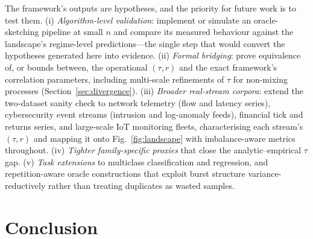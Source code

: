\documentclass[sensors,article,submit,pdftex,moreauthors]{Definitions/mdpi}
\providecommand{\DIFadd}[1]{{\protect\color{blue}#1}} %
\providecommand{\DIFdel}[1]{} %
\providecommand{\DIFaddbegin}{} %
\providecommand{\DIFaddend}{} %
\providecommand{\DIFdelbegin}{} %
\providecommand{\DIFdelend}{} %
\begin{document}
\DIFdelbegin \DIFdel{Future work should pursue: }\DIFdelend \DIFaddbegin \DIFadd{The framework's outputs are hypotheses, and the priority for future work is to test them. }\DIFaddend (i) \DIFdelbegin \DIFdel{tighter, family-specific correlation characterizations that close the proxy--empirical $\tau$ gap; }\DIFdelend \DIFaddbegin \emph{\DIFadd{Algorithm-level validation}}\DIFadd{: implement or simulate an oracle-sketching pipeline at small $n$ and compare its measured behaviour against the landscape's regime-level predictions---the single step that would convert the hypotheses generated here into evidence. }\DIFaddend (ii) \DIFdelbegin \DIFdel{extending the }\DIFdelend \DIFaddbegin \emph{\DIFadd{Formal bridging}}\DIFadd{: prove equivalence of, or bounds between, the operational $(\tau, r)$ and the exact framework's correlation parameters, including multi-scale refinements of $\tau$ for non-mixing processes (Section~\ref{sec:divergence}). (iii) }\emph{\DIFadd{Broader real-stream corpora}}\DIFadd{: extend the }\DIFaddend two-dataset \DIFdelbegin \DIFdel{real-stream sanity check in Section~\ref{sec:real_stream} to financial, network-traffic, }\DIFdelend \DIFaddbegin \DIFadd{sanity check to network telemetry (flow and latency series), cybersecurity event streams (intrusion and log-anomaly feeds), financial tick and returns series, }\DIFaddend and \DIFdelbegin \DIFdel{additional sensor streams, characterising their }\DIFdelend \DIFaddbegin \DIFadd{large-scale IoT monitoring fleets, characterising each stream's }\DIFaddend $(\tau, r)$ \DIFdelbegin \DIFdel{parameters and mapping them }\DIFdelend \DIFaddbegin \DIFadd{and mapping it }\DIFaddend onto Fig.~\ref{fig:landscape} with imbalance-aware metrics throughout\DIFdelbegin \DIFdel{; (iii) formal verification of the proxy formulas against the exact framework's correlation parameters; (}\DIFdelend \DIFaddbegin \DIFadd{. (}\DIFaddend iv) \DIFdelbegin \DIFdel{extension }\DIFdelend \DIFaddbegin \emph{\DIFadd{Tighter family-specific proxies}} \DIFadd{that close the analytic--empirical $\tau$ gap. (v) }\emph{\DIFadd{Task extensions}} \DIFaddend to multiclass classification and regression\DIFdelbegin \DIFdel{; and (v) }\DIFdelend \DIFaddbegin \DIFadd{, and }\DIFaddend repetition-aware oracle constructions that exploit burst structure variance-reductively rather than treating duplicates as wasted samples.


\section{Conclusion}
\label{sec:conclusion}
\end{document}
